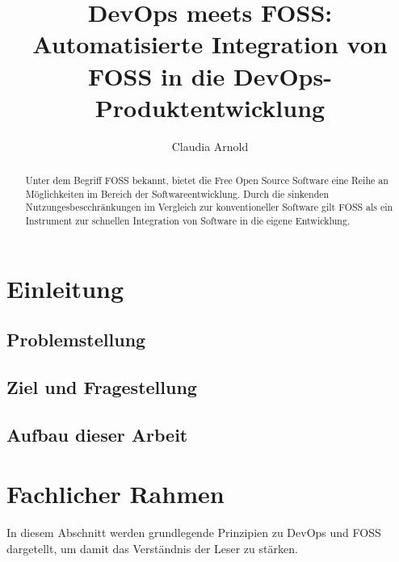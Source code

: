 \documentclass[12pt,titlepage]{article}
\begin{document}
\title{DevOps meets FOSS: Automatisierte Integration von FOSS in die DevOps-Produktentwicklung\\}

\author{Claudia Arnold}

\maketitle

\begin{abstract}
   Unter dem Begriff FOSS bekannt, bietet die Free Open Source Software eine Reihe an Möglichkeiten im Bereich der Softwareentwicklung. Durch die sinkenden Nutzungesbescchränkungen im Vergleich zur konventioneller Software gilt FOSS als ein Instrument zur schnellen Integration von Software in die eigene Entwicklung.  
    \end{abstract}

\section{Einleitung}



\subsection{Problemstellung}



\subsection{Ziel und Fragestellung}



\subsection{Aufbau dieser Arbeit}



\section{Fachlicher Rahmen}

In diesem Abschnitt werden grundlegende Prinzipien zu DevOps und FOSS dargetellt, um damit das Verständnis der Leser zu stärken.\\
\end{document}
